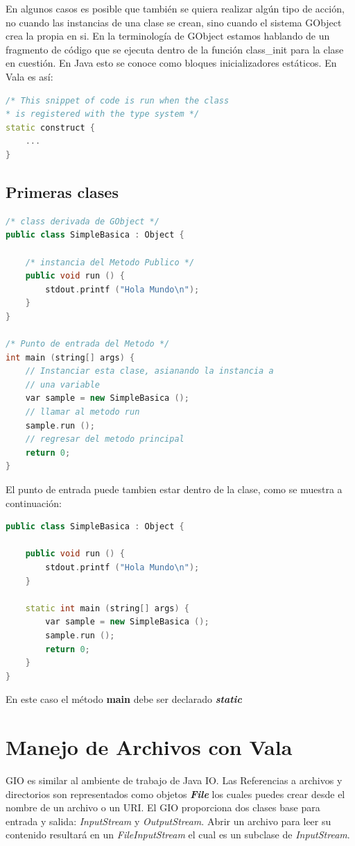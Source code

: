 \documentclass[12pt,twoside]{book}
\begin{document}
En algunos casos es posible que también se quiera realizar algún tipo de acción, no cuando las instancias de una clase se crean, sino cuando el sistema GObject crea la propia en si. En la terminología de GObject estamos hablando de un fragmento de código que se ejecuta dentro de la función class\_init para la clase en cuestión. En Java esto se conoce como bloques inicializadores estáticos. En Vala es así:

\begin{lstlisting}[language=C++]
/* This snippet of code is run when the class
* is registered with the type system */
static construct {
	...
}
\end{lstlisting}


\section{Primeras clases}

\begin{lstlisting}[language=C++]
/* class derivada de GObject */
public class SimpleBasica : Object {
	
	/* instancia del Metodo Publico */
	public void run () {
		stdout.printf ("Hola Mundo\n");
	}
}

/* Punto de entrada del Metodo */
int main (string[] args) {
	// Instanciar esta clase, asianando la instancia a
	// una variable
	var sample = new SimpleBasica ();
	// llamar al metodo run
	sample.run ();
	// regresar del metodo principal
	return 0;
}
\end{lstlisting}

El punto de entrada puede tambien estar dentro de la clase, como se muestra a continuación:

\begin{lstlisting}[language=C++]
public class SimpleBasica : Object {
	
	public void run () {
		stdout.printf ("Hola Mundo\n");
	}
	
	static int main (string[] args) {
		var sample = new SimpleBasica ();
		sample.run ();
		return 0;
	}
}
\end{lstlisting}

En este caso el método \textbf{main} debe ser declarado \textbf{\textit{static}}

\chapter{Manejo de Archivos con Vala}

GIO es similar al ambiente de trabajo de Java IO. Las Referencias a archivos y directorios son representados como objetos \textit{\textbf{File}} los cuales puedes crear desde el nombre de un archivo o un URI. El GIO proporciona dos clases base para entrada y salida: \textit{InputStream} y \textit{OutputStream}. Abrir un archivo para leer su contenido resultará en un \textit{FileInputStream} el cual es un subclase de \textit{InputStream}.
\end{document}
